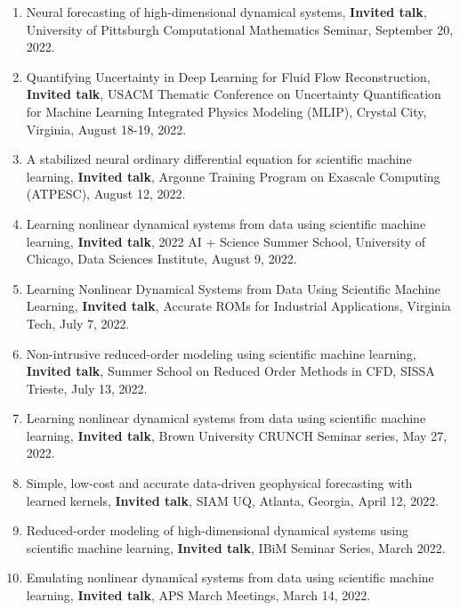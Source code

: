 \documentclass[letterpaper]{article}
\begin{document}
\begin{enumerate}


\item Neural forecasting of high-dimensional dynamical systems, \textbf{Invited talk}, University of Pittsburgh Computational Mathematics Seminar, September 20, 2022.

\item Quantifying Uncertainty in Deep Learning for Fluid Flow Reconstruction, \textbf{Invited talk}, USACM Thematic Conference on Uncertainty Quantification for Machine Learning Integrated Physics Modeling (MLIP), Crystal City, Virginia, August 18-19, 2022.

\item A stabilized neural ordinary differential equation for scientific machine learning, \textbf{Invited talk}, Argonne Training Program on Exascale Computing (ATPESC), August 12, 2022.

\item Learning nonlinear dynamical systems from data using scientific machine learning, \textbf{Invited talk}, 2022 AI + Science Summer School, University of Chicago, Data Sciences Institute, August 9, 2022.

\item Learning Nonlinear Dynamical Systems from Data Using Scientific Machine Learning, \textbf{Invited talk}, Accurate ROMs for Industrial Applications, Virginia Tech, July 7, 2022.

\item Non-intrusive reduced-order modeling using scientific machine learning, \textbf{Invited talk}, Summer School on Reduced Order Methods in CFD, SISSA Trieste, July 13, 2022.

\item Learning nonlinear dynamical systems from data using scientific machine learning, \textbf{Invited talk}, Brown University CRUNCH Seminar series, May 27, 2022. 

\item Simple, low-cost and accurate data-driven geophysical forecasting with learned kernels, \textbf{Invited talk}, SIAM UQ, Atlanta, Georgia, April 12, 2022.

\item Reduced-order modeling of high-dimensional dynamical systems using scientific machine learning, \textbf{Invited talk}, IBiM Seminar Series, March 2022.

\item Emulating nonlinear dynamical systems from data using scientific machine learning, \textbf{Invited talk}, APS March Meetings, March 14, 2022.


\end{enumerate}
\end{document}
